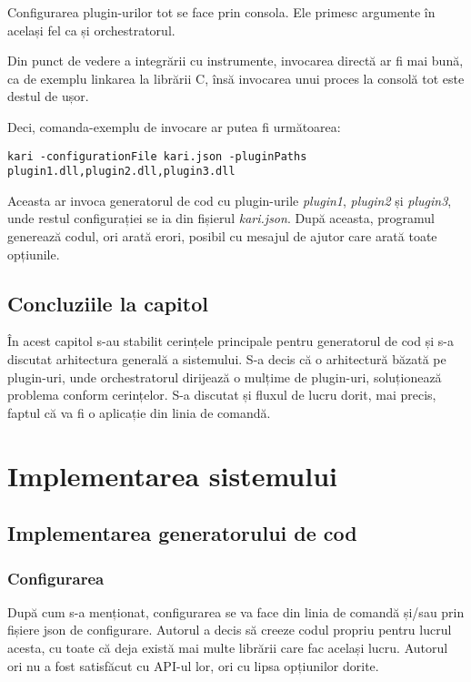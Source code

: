 \documentclass[a4paper,12pt]{report}
\def\oldchapter{} \let\oldchapter=\chapter{}
\def\chapter{\stepcounter{num_chapters}\oldchapter}
\newcommand\chapterConclusionSection[1]{\section{Concluziile la capitol \arabic{chapter}}}
\begin{document}
Configurarea plugin-urilor tot se face prin consola.
Ele primesc argumente în același fel ca și orchestratorul.

Din punct de vedere a integrării cu instrumente, invocarea directă ar fi mai bună, ca de exemplu linkarea la librării C, însă invocarea unui proces la consolă tot este destul de ușor.

Deci, comanda-exemplu de invocare ar putea fi următoarea:

\begin{verbatim}
kari -configurationFile kari.json -pluginPaths plugin1.dll,plugin2.dll,plugin3.dll
\end{verbatim}

Aceasta ar invoca generatorul de cod cu plugin-urile \textit{plugin1}, \textit{plugin2} și \textit{plugin3}, unde restul configurației se ia din fișierul \textit{kari{.}json}.
După aceasta, programul generează codul, ori arată erori, posibil cu mesajul de ajutor care arată toate opțiunile.


\chapterConclusionSection{architecture_chapter_id}

În acest capitol s-au stabilit cerințele principale pentru generatorul de cod și s-a discutat arhitectura generală a sistemului.
S-a decis că o arhitectură băzată pe plugin-uri, unde orchestratorul dirijează o mulțime de plugin-uri, soluționează problema conform cerințelor.
S-a discutat și fluxul de lucru dorit, mai precis, faptul că va fi o aplicație din linia de comandă.

\chapter{Implementarea sistemului}\label{implementation_chapter_id}

\section{Implementarea generatorului de cod}

\subsection{Configurarea}

După cum s-a menționat, configurarea se va face din linia de comandă și/sau prin fișiere json de configurare.
Autorul a decis să creeze codul propriu pentru lucrul acesta, cu toate că deja există mai multe librării care fac același lucru.
Autorul ori nu a fost satisfăcut cu \ac{API}-ul lor, ori cu lipsa opțiunilor dorite.
\end{document}
